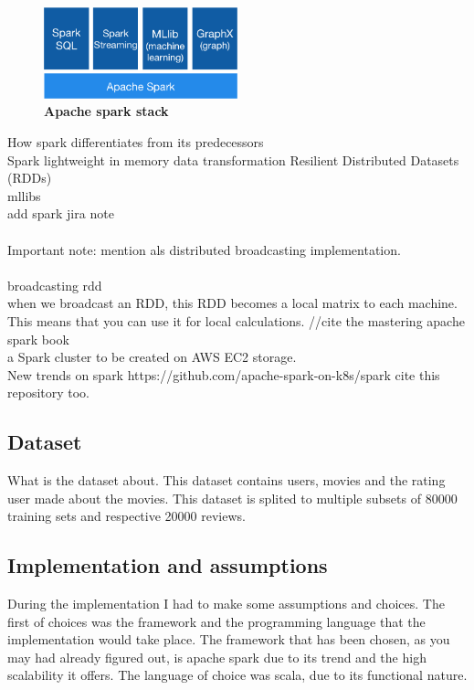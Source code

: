 \begin{figure}[ht]
  \centering
    \includegraphics[width=0.5\textwidth]{images/spark-stack.png}
    \caption{\bfseries Apache spark stack \cite{ApacheSpark:1}}
   \label{apacheSparkStack}
\end{figure}

How spark differentiates from its predecessors\\
Spark lightweight in memory data transformation 
Resilient Distributed Datasets (RDDs) \\
mllibs\\
add spark jira note \\\\
Important note: mention als distributed broadcasting implementation. 
\\\\
broadcasting rdd \\ when we broadcast an RDD, this RDD becomes a local matrix to each machine. This means that you can use it for local calculations.
//cite the mastering apache spark book
\cite{ApacheSpark:1} \\
a Spark cluster to be created on AWS EC2 storage.\\
New trends on spark https://github.com/apache-spark-on-k8s/spark cite this repository too.
\subsection{Dataset}
What is the dataset about. This dataset contains users, movies and the rating user made about the movies.
This dataset is splited to multiple subsets of 80000 training sets and respective 20000 reviews.
\cite{MovieLens:3}

\subsection{Implementation and assumptions}
During the implementation I had to make some assumptions and choices. The first of choices was the framework and the programming language that the implementation would take place. The framework that has been chosen, as you may had already figured out, is apache spark due to its trend and the high scalability it offers. The language of choice was scala, due to its functional nature.
